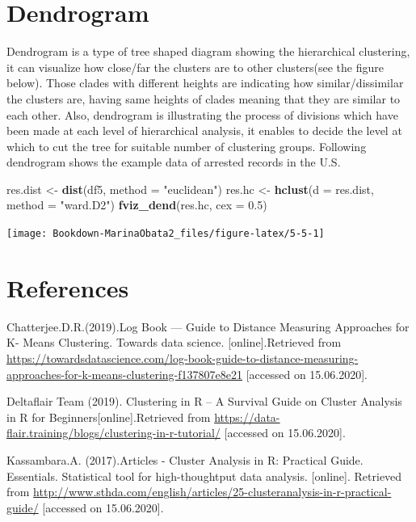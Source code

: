 \documentclass[]{book}
\newenvironment{Shaded}{\begin{snugshade}}{\end{snugshade}}
\newcommand{\DataTypeTok}[1]{\textcolor[rgb]{0.13,0.29,0.53}{#1}}
\newcommand{\FloatTok}[1]{\textcolor[rgb]{0.00,0.00,0.81}{#1}}
\newcommand{\KeywordTok}[1]{\textcolor[rgb]{0.13,0.29,0.53}{\textbf{#1}}}
\newcommand{\NormalTok}[1]{#1}
\newcommand{\StringTok}[1]{\textcolor[rgb]{0.31,0.60,0.02}{#1}}
\begin{document}
\hypertarget{dendrogram}{%
\section{Dendrogram}\label{dendrogram}}

Dendrogram is a type of tree shaped diagram showing the hierarchical clustering, it can visualize how close/far the clusters are to other clusters(see the figure below). Those clades with different heights are indicating how similar/dissimilar the clusters are, having same heights of clades meaning that they are similar to each other. Also, dendrogram is illustrating the process of divisions which have been made at each level of hierarchical analysis, it enables to decide the level at which to cut the tree for suitable number of clustering groups.
Following dendrogram shows the example data of arrested records in the U.S.

\begin{Shaded}
\begin{Highlighting}[]
\NormalTok{res.dist <-}\StringTok{ }\KeywordTok{dist}\NormalTok{(df5, }\DataTypeTok{method =} \StringTok{"euclidean"}\NormalTok{)}
\NormalTok{res.hc <-}\StringTok{ }\KeywordTok{hclust}\NormalTok{(}\DataTypeTok{d =}\NormalTok{ res.dist, }\DataTypeTok{method =} \StringTok{"ward.D2"}\NormalTok{)}
\KeywordTok{fviz_dend}\NormalTok{(res.hc, }\DataTypeTok{cex =} \FloatTok{0.5}\NormalTok{)}
\end{Highlighting}
\end{Shaded}

\texttt{[image: Bookdown-MarinaObata2\_files/figure-latex/5-5-1]}

\hypertarget{references-4}{%
\section{References}\label{references-4}}

Chatterjee.D.R.(2019).Log Book --- Guide to Distance Measuring Approaches for K- Means Clustering. Towards data science. {[}online{]}.Retrieved from \url{https://towardsdatascience.com/log-book-guide-to-distance-measuring-approaches-for-k-means-clustering-f137807e8e21} {[}accessed on 15.06.2020{]}.

Deltaflair Team (2019). Clustering in R -- A Survival Guide on Cluster Analysis in R for Beginners{[}online{]}.Retrieved from \url{https://data-flair.training/blogs/clustering-in-r-tutorial/} {[}accessed on 15.06.2020{]}.

Kassambara.A. (2017).Articles - Cluster Analysis in R: Practical Guide. Essentials. Statistical tool for high-thoughtput data analysis. {[}online{]}. Retrieved from \url{http://www.sthda.com/english/articles/25-clusteranalysis-in-r-practical-guide/} {[}accessed on 15.06.2020{]}.
\end{document}
